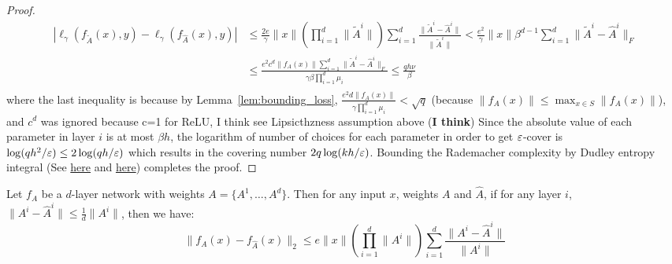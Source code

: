\begin{proof}
    \begin{align*}
    |\ell_\gamma(f_{\tilde{A}}(x),y) -\ell_\gamma(f_{\hat{A}}(x),y)| &\leq
    \frac{2e}{\gamma}\|x\|\left(\prod_{i=1}^{d} \|\tilde{A}^i\| \right) \sum_{i=1}^d \frac{\|\tilde{A}^i-\hat{A}^i\|}{\|\tilde{A}^i\|} < \frac{e^2}{\gamma}\|x\| \beta^{d-1}\sum_{i=1}^d \|\tilde{A}^i-\hat{A}^i\|_F\\
    &\leq \frac{e^2c^d \|f_A(x)\| \sum_{i=1}^d \|\tilde{A}^i-\hat{A}^i\|_F}{\gamma\beta\prod_{i=1}^d \mu_i} \leq \frac{qh\nu}{\beta}\\
    \end{align*}
    where the last inequality is because by Lemma~\ref{lem:bounding_loss}, $\frac{e^2d \|f_A(x)\|}{\gamma\prod_{i=1}^d \mu_i } < \sqrt{q}$ (because $\|f_A(x)\| \leq \max_{x\in S} \|f_A(x)\|$), and $c^d$ was ignored because c=1 for ReLU, I think see Lipsicthzness assumption above (\textbf{I think})
    Since the absolute value of each parameter in layer $i$ is at most $\beta h$, the logarithm of number of choices for each parameter in order to get $\eps$-cover is $\log(qh^2/\eps) \leq 2\log(qh/\eps)$ which results in the covering number $2q\log(kh/\eps)$. Bounding the Rademacher complexity by Dudley entropy integral (See \href{https://cstheory.stackexchange.com/questions/40472/pac-learning-bound-with-epsilon-cover-of-hypothesis-class}{here} and \href{http://www.cs.berkeley.edu/~bartlett/courses/281b-sp06/lecture24.ps}{here}) completes the proof.
\end{proof}

\begin{lemma}\label{lem:lipschitz}
    Let $f_A$ be a $d$-layer network with weights $A=\{A^1,\dots, A^d\}$. Then for any input $x$, weights $A$ and $\hat{A}$, if for any layer $i$, $\|A^i-\hat{A}^i\| \leq \frac{1}{d}\|A^i\|$, then we have:
    \begin{equation*}
    \|f_A(x)-f_{\hat{A}}(x)\|_2 \leq e\|x\|\left(\prod_{i=1}^{d} \|A^i\| \right) \sum_{i=1}^d \frac{\|A^i-\hat{A}^i\|}{\|A^i\|}
    \end{equation*}
\end{lemma}

